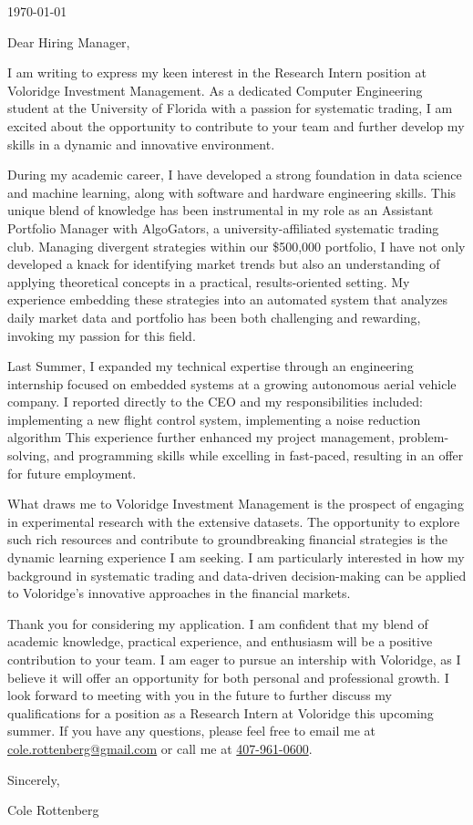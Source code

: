 \documentclass{ExpressiveCoverLetter}
\begin{document}
\coverletterheader[
    firstname=Cole,
    middleinitial=H,
    lastname=Rottenberg,
    email=cole.rottenberg@gmail.com,
    phone=407-961-0600,
    linkedin=cole-rottenberg,
    github=colerottenberg,
    city=Orlando,
    state=Florida,
]

\today

Dear Hiring Manager,

I am writing to express my keen interest in the Research Intern position at Voloridge Investment Management.
As a dedicated Computer Engineering student at the University of Florida with a passion for systematic trading, I am excited about the opportunity to contribute to your team and further develop my skills in a dynamic and innovative environment.

During my academic career, I have developed a strong foundation in data
science and machine learning, along with software and hardware engineering
skills.
This unique blend of knowledge has been instrumental in my role as an
Assistant Portfolio Manager with AlgoGators, a university-affiliated
systematic trading club.
Managing divergent strategies within our \$500,000 portfolio, I have not
only developed a knack for identifying
market trends but also an understanding of applying theoretical
concepts in a practical, results-oriented setting.
My experience embedding these strategies into an automated system that
analyzes daily market data and portfolio has been both challenging and rewarding,
invoking my passion for this field.

Last Summer, I expanded my technical expertise through an
engineering internship focused on embedded systems at a growing
autonomous aerial vehicle company. I reported directly to the CEO and my
responsibilities included:
implementing a new flight control system, implementing a noise reduction
algorithm
This experience further enhanced my project management, problem-solving,
and programming skills while excelling in fast-paced, resulting in an
offer for future employment.

What draws me to Voloridge Investment Management is the prospect of
engaging in experimental research with the extensive datasets.
The opportunity to explore such rich resources and contribute to
groundbreaking financial strategies is the dynamic learning experience I
am seeking. I am particularly interested in how my background in
systematic trading and data-driven decision-making can be applied to
Voloridge's innovative approaches in the financial markets.

Thank you for considering my application. I am confident that my blend
of academic knowledge, practical experience, and enthusiasm will be a
positive contribution to your team. I am eager to pursue an intership
with Voloridge, as I believe it will offer an opportunity for both
personal and professional growth. I look forward to meeting with you in
the future to further discuss my qualifications for a position as a
Research Intern at Voloridge this upcoming summer. If you have any
questions, please feel free to email me at
\href{mailto:cole.rottenberg@gmail.com}{cole.rottenberg@gmail.com}
or call me at \href{tel:+1-407-961-0600}{407-961-0600}.

Sincerely,
\vspace{-15pt}

Cole Rottenberg
\end{document}
